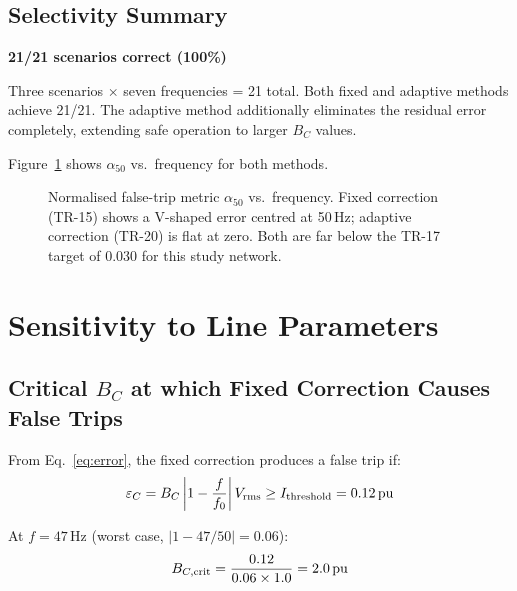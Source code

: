 \documentclass[11pt, a4paper]{article}
\begin{document}
\subsection{Selectivity Summary}

\begin{center}
\Large
\textbf{\textcolor{okgreen}{21/21 scenarios correct (100\%)}}
\end{center}

Three scenarios $\times$ seven frequencies = 21 total.  Both fixed and adaptive
methods achieve 21/21.  The adaptive method additionally eliminates the
residual error completely, extending safe operation to larger $B_C$ values.

Figure~\ref{fig:a50} shows $\alpha_{50}$ vs.\ frequency for both methods.

\begin{figure}[h]
  \centering
  
  \caption{Normalised false-trip metric $\alpha_{50}$ vs.\ frequency.
           Fixed correction (TR-15) shows a V-shaped error centred at
           50\,Hz; adaptive correction (TR-20) is flat at zero.
           Both are far below the TR-17 target of 0.030 for this study network.}
  \label{fig:a50}
\end{figure}


\section{Sensitivity to Line Parameters}
\label{sec:sensitivity}

\subsection{Critical $B_C$ at which Fixed Correction Causes False Trips}

From Eq.~\eqref{eq:error}, the fixed correction produces a false trip if:
\begin{equation}
  \varepsilon_C = B_C \left|1 - \frac{f}{f_0}\right| V_{\rm rms}
  \geq I_{\rm threshold} = 0.12\,\text{pu}
\end{equation}

At $f=47$\,Hz (worst case, $|1 - 47/50| = 0.06$):
\begin{equation}
  B_{C,\rm crit} = \frac{0.12}{0.06 \times 1.0} = 2.0\,\text{pu}
\end{equation}
\end{document}
